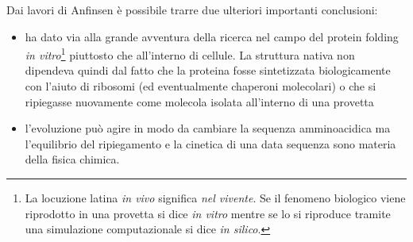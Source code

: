 {{Dai lavori di Anfinsen è possibile trarre due ulteriori importanti conclusioni\supercite{dill2008protein}:
\begin{itemize}
	\item ha dato via alla grande avventura della ricerca nel campo del protein folding \textit{in vitro}\footnote{La locuzione latina \textit{in vivo} significa \textit{nel vivente}. Se il fenomeno biologico viene riprodotto in una provetta si dice \textit{in vitro} mentre se lo si riproduce tramite una simulazione computazionale si dice \textit{in silico}.} piuttosto che all'interno di cellule. La struttura nativa non dipendeva quindi dal fatto che la proteina fosse sintetizzata biologicamente con l'aiuto di ribosomi (ed eventualmente chaperoni molecolari) o che si ripiegasse nuovamente come molecola isolata all'interno di una provetta
	\item l'evoluzione può agire in modo da cambiare la sequenza amminoacidica ma l'equilibrio del ripiegamento e la cinetica di una data sequenza sono materia della fisica chimica.
\end{itemize}}

}

